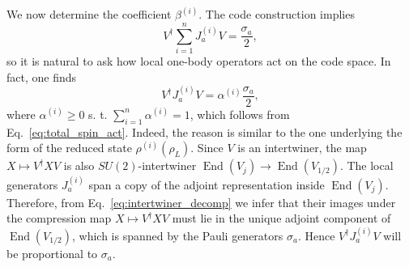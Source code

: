 \documentclass[10pt,twocolumn,superscriptaddress,aps,amsmath,amssymb,citeautoscript,floatfix,prx,longbibliography]{revtex4-2}
\theoremstyle{plain}
\theoremstyle{plain}
\theoremstyle{plain}
\theoremstyle{plain}
\theoremstyle{plain}
\theoremstyle{plain}
\begin{document}
We now determine the coefficient \(\beta^{(i)}\). The code construction implies 
\begin{equation}\label{eq:total_spin_act}
V^{\dagger} \sum_{i=1}^nJ_a^{(i)} V=\frac{\sigma_a}{2},
\end{equation}
so it is natural to ask how local one-body operators act on the code space. In fact, one finds
\begin{equation}\label{eq:alpha_def}
V^{\dagger} J_a^{(i)} V=\alpha^{(i)} \frac{\sigma_a}{2},
\end{equation}
where $\alpha^{(i)}\geq 0$ s. t. $\sum_{i=1}^n \alpha^{(i)}=1$, which follows from Eq.~\eqref{eq:total_spin_act}. Indeed, the reason is similar to the one underlying the form of the reduced state $\rho^{(i)}(\rho_L)$. Since \(V\) is an intertwiner, the map
$
    X\longmapsto V^\dagger X V
$
is also \(SU(2)\)-intertwiner $\operatorname{End}(V_j)\rightarrow \operatorname{End}(V_{1/2})$. The local generators \(J_a^{(i)}\) span a copy of the adjoint representation inside \(\operatorname{End}(V_j)\). Therefore, from Eq.~\eqref{eq:intertwiner_decomp} we infer that their images under the compression map 
$
    X\longmapsto V^\dagger X V
$ 
must lie in the unique adjoint component of
\(\operatorname{End}(V_{1/2})\), which is spanned by the Pauli generators \(\sigma_a\). Hence $V^{\dagger} J_a^{(i)} V$ will be proportional to \(\sigma_a\).
\end{document}
